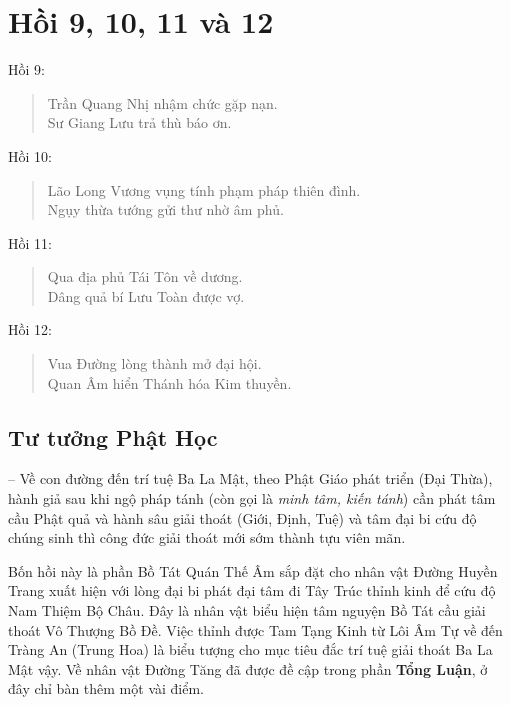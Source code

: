 \chapter{Hồi 9, 10, 11 và 12} %
\label{cha:hoi_9_10_11_và_12}

Hồi 9:

\begin{verse}
\begin{itshape}
Trần Quang Nhị nhậm chức gặp nạn.\\
Sư Giang Lưu trả thù báo ơn.
\end{itshape}
\end{verse}

Hồi 10:

\begin{verse}
\begin{itshape}
Lão Long Vương vụng tính phạm pháp thiên đình.\\
Ngụy thừa tướng gửi thư nhờ âm phủ.
\end{itshape}
\end{verse}

Hồi 11:

\begin{verse}
\begin{itshape}
Qua địa phủ Tái Tôn về dương.\\
Dâng quả bí Lưu Toàn được vợ.
\end{itshape}
\end{verse}

Hồi 12:

\begin{verse}
\begin{itshape}
Vua Đường lòng thành mở đại hội.\\
Quan Âm hiển Thánh hóa Kim thuyền.
\end{itshape}
\end{verse}

\section{Tư tưởng Phật Học} %
\label{sec:9_phat_hoc}

-- Về con đường đến trí tuệ Ba La Mật, theo Phật Giáo phát triển (Đại Thừa), hành giả sau khi ngộ pháp tánh (còn gọi là \emph{minh tâm, kiến tánh}) cần phát tâm cầu Phật quả và hành sâu giải thoát (Giới, Định, Tuệ) và tâm đại bi cứu độ chúng sinh thì công đức giải thoát mới sớm thành tựu viên mãn.

Bốn hồi này là phần Bồ Tát Quán Thế Âm sắp đặt cho nhân vật Đường Huyền Trang xuất hiện với lòng đại bi phát đại tâm đi Tây Trúc thỉnh kinh để cứu độ Nam Thiệm Bộ Châu. Đây là nhân vật biểu hiện tâm nguyện Bồ Tát cầu giải thoát Vô Thượng Bồ Đề. Việc thỉnh được Tam Tạng Kinh từ Lôi Âm Tự về đến Tràng An (Trung Hoa) là biểu tượng cho mục tiêu đắc trí tuệ giải thoát Ba La Mật vậy. Về nhân vật Đường Tăng đã được đề cập trong phần {\bf Tổng Luận}, ở đây chỉ bàn thêm một vài điểm.

